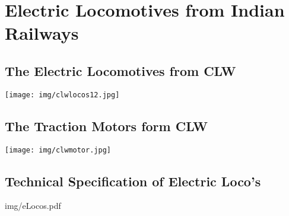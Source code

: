 \documentclass[11pt,twoside,openany,svgnames,x11names]{gkbookm1}
\begin{document}
\chapter{Electric Locomotives from Indian Railways}
\renewcommand\chapterillustration{img/IRlogo.jpg}

%


\section{The Electric Locomotives from CLW}

\begin{center}
\texttt{[image: img/clwlocos12.jpg]}
\end{center}

\section{The Traction Motors form CLW}
\begin{center}
\texttt{[image: img/clwmotor.jpg]}
\end{center}


\cleardoublepage
%
%
\section{Technical Specification of Electric Loco's}




{img/eLocos.pdf}


\end{document}
